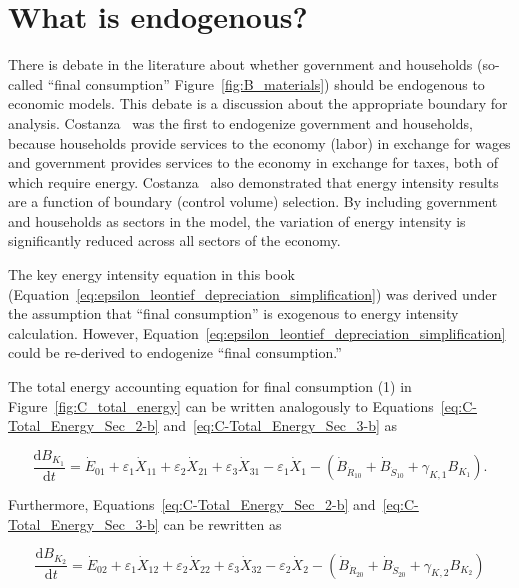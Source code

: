 \section{What is endogenous?}
\label{sec:what_is_endogenous}

There is debate in the literature about whether government 
and households 
(so-called ``final consumption'' Figure~\ref{fig:B_materials}) 
should be endogenous to economic models.
This debate is a discussion about the appropriate boundary
for analysis.
Costanza~\cite{Costanza:1980ww} was the first to endogenize government and households, 
because households provide services to the economy (labor) in exchange for wages 
and government provides services to the economy in exchange for taxes, 
both of which require energy. 
Costanza~\cite{Costanza:1980ww} also demonstrated that 
energy intensity results
are a function of boundary (control volume) selection. 
By including government and households 
as sectors in the model, 
the variation of energy intensity is significantly reduced 
across all sectors of the economy. 

The key energy intensity equation in this book
(Equation~\ref{eq:epsilon_leontief_depreciation_simplification})
was derived under the assumption that ``final consumption''
is exogenous to energy intensity calculation.
However, Equation~\ref{eq:epsilon_leontief_depreciation_simplification}
could be re-derived to endogenize 
``final consumption.''

The total energy accounting equation for final consumption (1)
in Figure~\ref{fig:C_total_energy} can be written 
analogously to Equations~\ref{eq:C-Total_Energy_Sec_2-b}
and~\ref{eq:C-Total_Energy_Sec_3-b} as

\begin{equation} \label{eq:C-Total_Energy_Sec_1-unfinished}
	\frac{\mathrm{d}B_{K_{1}}}{\mathrm{d}t}
	= \dot{E}_{01}
	+ \varepsilon_{1} \dot{X}_{11}
	+ \varepsilon_{2} \dot{X}_{21}
	+ \varepsilon_{3} \dot{X}_{31}
	- \varepsilon_{1} \dot{X}_{1}
	- \left( \dot{B}_{\dot{R}_{10}} 
							+ \dot{B}_{\dot{S}_{10}}
							+ \gamma_{K,1} B_{K_{1}}
							\right).
\end{equation}

\noindent{}Furthermore, Equations~\ref{eq:C-Total_Energy_Sec_2-b}
and~\ref{eq:C-Total_Energy_Sec_3-b}
can be rewritten as 

\begin{equation} \label{eq:C-Total_Energy_Sec_2-unfinished}
	\frac{\mathrm{d}B_{K_{2}}}{\mathrm{d}t}
	= \dot{E}_{02}
	+ \varepsilon_{1} \dot{X}_{12}
	+ \varepsilon_{2} \dot{X}_{22}
	+ \varepsilon_{3} \dot{X}_{32}
	- \varepsilon_{2} \dot{X}_{2}
	- \left( \dot{B}_{\dot{R}_{20}} 
							+ \dot{B}_{\dot{S}_{20}}
							+ \gamma_{K,2} B_{K_{2}}
							\right)
\end{equation}

